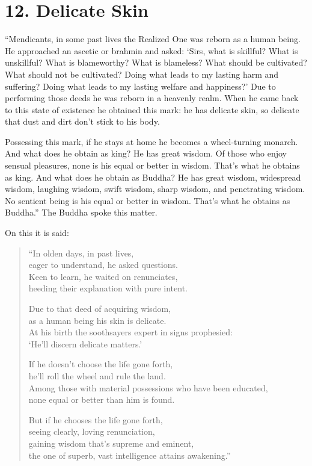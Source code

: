 \documentclass[12pt,openany]{book}%
\begin{document}
\section*{12. Delicate Skin }

“Mendicants, in some past lives the Realized One was reborn as a human being. He approached an ascetic or brahmin and asked: ‘Sirs, what is skillful? What is unskillful? What is blameworthy? What is blameless? What should be cultivated? What should not be cultivated? Doing what leads to my lasting harm and suffering? Doing what leads to my lasting welfare and happiness?’ Due to performing those deeds he was reborn in a heavenly realm. When he came back to this state of existence he obtained this mark: he has delicate skin, so delicate that dust and dirt don’t stick to his body. 

Possessing this mark, if he stays at home he becomes a wheel-turning monarch. And what does he obtain as king? He has great wisdom. Of those who enjoy sensual pleasures, none is his equal or better in wisdom. That’s what he obtains as king. And what does he obtain as Buddha? He has great wisdom, widespread wisdom, laughing wisdom, swift wisdom, sharp wisdom, and penetrating wisdom. No sentient being is his equal or better in wisdom. That’s what he obtains as Buddha.” The Buddha spoke this matter. 

On this it is said: 

\begin{verse}%
“In olden days, in past lives, \\
eager to understand, he asked questions. \\
Keen to learn, he waited on renunciates, \\
heeding their explanation with pure intent. 

Due to that deed of acquiring wisdom, \\
as a human being his skin is delicate. \\
At his birth the soothsayers expert in signs prophesied: \\
‘He’ll discern delicate matters.’ 

If he doesn’t choose the life gone forth, \\
he’ll roll the wheel and rule the land. \\
Among those with material possessions who have been educated, \\
none equal or better than him is found. 

But if he chooses the life gone forth, \\
seeing clearly, loving renunciation, \\
gaining wisdom that’s supreme and eminent, \\
the one of superb, vast intelligence attains awakening.” 

%
\end{verse}
\end{document}
